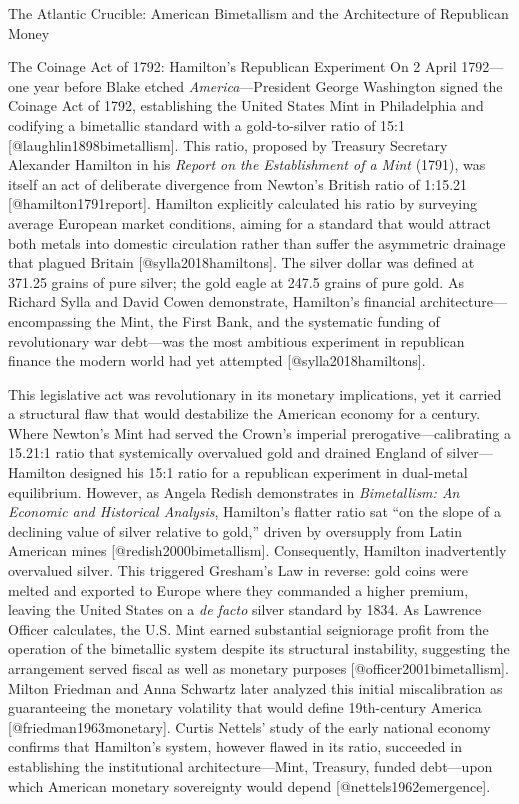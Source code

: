\documentclass[
  ignorenonframetext,
]{beamer}
\begin{document}
\begin{frame}{The Atlantic Crucible: American Bimetallism and the
Architecture of Republican Money}
\begin{block}{The Coinage Act of 1792: Hamilton's Republican Experiment}
\protect{}\label{the-coinage-act-of-1792-hamiltons-republican-experiment}
On 2 April 1792---one year before Blake etched
\emph{America}---President George Washington signed the Coinage Act of
1792, establishing the United States Mint in Philadelphia and codifying
a bimetallic standard with a gold-to-silver ratio of 15:1
{[}@laughlin1898bimetallism{]}. This ratio, proposed by Treasury
Secretary Alexander Hamilton in his \emph{Report on the Establishment of
a Mint} (1791), was itself an act of deliberate divergence from Newton's
British ratio of 1:15.21 {[}@hamilton1791report{]}. Hamilton explicitly
calculated his ratio by surveying average European market conditions,
aiming for a standard that would attract both metals into domestic
circulation rather than suffer the asymmetric drainage that plagued
Britain {[}@sylla2018hamiltons{]}. The silver dollar was defined at
371.25 grains of pure silver; the gold eagle at 247.5 grains of pure
gold. As Richard Sylla and David Cowen demonstrate, Hamilton's financial
architecture---encompassing the Mint, the First Bank, and the systematic
funding of revolutionary war debt---was the most ambitious experiment in
republican finance the modern world had yet attempted
{[}@sylla2018hamiltons{]}.

This legislative act was revolutionary in its monetary implications, yet
it carried a structural flaw that would destabilize the American economy
for a century. Where Newton's Mint had served the Crown's imperial
prerogative---calibrating a 15.21:1 ratio that systemically overvalued
gold and drained England of silver---Hamilton designed his 15:1 ratio
for a republican experiment in dual-metal equilibrium. However, as
Angela Redish demonstrates in \emph{Bimetallism: An Economic and
Historical Analysis}, Hamilton's flatter ratio sat ``on the slope of a
declining value of silver relative to gold,'' driven by oversupply from
Latin American mines {[}@redish2000bimetallism{]}. Consequently,
Hamilton inadvertently overvalued silver. This triggered Gresham's Law
in reverse: gold coins were melted and exported to Europe where they
commanded a higher premium, leaving the United States on a \emph{de
facto} silver standard by 1834. As Lawrence Officer calculates, the U.S.
Mint earned substantial seigniorage profit from the operation of the
bimetallic system despite its structural instability, suggesting the
arrangement served fiscal as well as monetary purposes
{[}@officer2001bimetallism{]}. Milton Friedman and Anna Schwartz later
analyzed this initial miscalibration as guaranteeing the monetary
volatility that would define 19th-century America
{[}@friedman1963monetary{]}. Curtis Nettels' study of the early national
economy confirms that Hamilton's system, however flawed in its ratio,
succeeded in establishing the institutional architecture---Mint,
Treasury, funded debt---upon which American monetary sovereignty would
depend {[}@nettels1962emergence{]}.


\end{block}
\end{frame}
\end{document}
